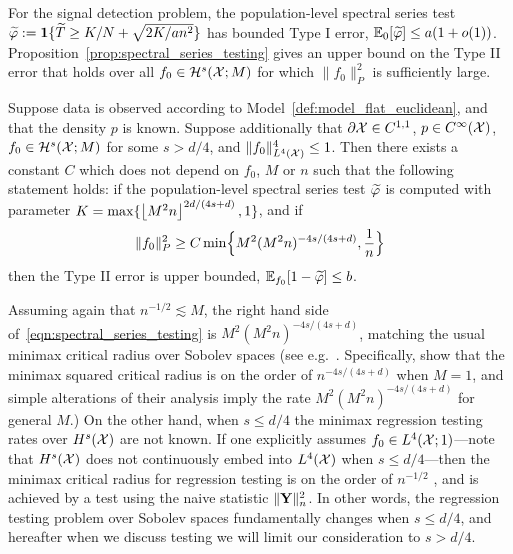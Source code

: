 For the signal detection problem, the population-level spectral series test $\widetilde{\varphi} := \mathbf{1}\{\widetilde{T} \geq K/N + \sqrt{2K/an^2}\}$ has bounded Type I error, $\mathbb{E}_{0}[\widetilde{\varphi}] \leq a (1 + o(1))$. Proposition~\ref{prop:spectral_series_testing} gives an upper bound on the Type II error that holds over all $f_0 \in \mathcal{H}^s(\mathcal{X};M)$ for which $\|f_0\|_P^2$ is sufficiently large.
\begin{proposition}
	\label{prop:spectral_series_testing}
	Suppose data is observed according to Model~\ref{def:model_flat_euclidean}, and that the density $p$ is known.  Suppose additionally that $\partial \mathcal{X} \in C^{1,1}$, $p \in C^{\infty}(\mathcal{X})$, $f_0 \in \mathcal{H}^{s}(\mathcal{X};M)$ for some $s > d/4$, and $\|f_0\|_{L^4(\mathcal{X})}^4 \leq 1$. Then there exists a constant $C$ which does not depend on $f_0$, $M$ or $n$ such that the following statement holds: if the population-level spectral series test $\widetilde{\varphi}$ is computed with parameter $K = \max\{\left\lfloor M^2n \right\rfloor^{2d/(4s + d)},1\}$, and if
	\begin{equation}
	\label{eqn:spectral_series_testing}
	\|f_0\|_P^2 \geq C\min\Bigl\{M^2(M^2n)^{-4s/(4s + d)}, \frac{1}{n}\Bigr\}
	\end{equation}
	then the Type II error is upper bounded, $\mathbb{E}_{f_0}[1 - \widetilde{\varphi}] \leq b$.
\end{proposition}
Assuming again that $n^{-1/2} \lesssim M$, the right hand side of~\eqref{eqn:spectral_series_testing} is $M^2(M^2n)^{-4s/(4s + d)}$, matching the usual minimax critical radius over Sobolev spaces (see e.g.~\cite{guerre02,ingster2009,ingster2012}. Specifically, \cite{ingster2009} show that the minimax squared critical radius is on the order of $n^{-4s/(4s + d)}$ when $M = 1$, and simple alterations of their analysis imply the rate $M^2(M^2n)^{-4s/(4s + d)}$ for general $M$.) On the other hand, when $s \leq d/4$ the minimax regression testing rates over $H^s(\mathcal{X})$ are not known. If one explicitly assumes $f_0 \in L^4(\mathcal{X};1)$---note that $H^s(\mathcal{X})$ does not continuously embed into $L^4(\mathcal{X})$ when $s \leq d/4$---then the minimax critical radius for regression testing is on the order of $n^{-1/2}$ \citep{guerre02}, and is achieved by a test using the naive statistic $\|{\bf Y}\|_n^2$. In other words, the regression testing problem over Sobolev spaces fundamentally changes when $s \leq d/4$, and hereafter when we discuss testing we will limit our consideration to $s > d/4$. 

